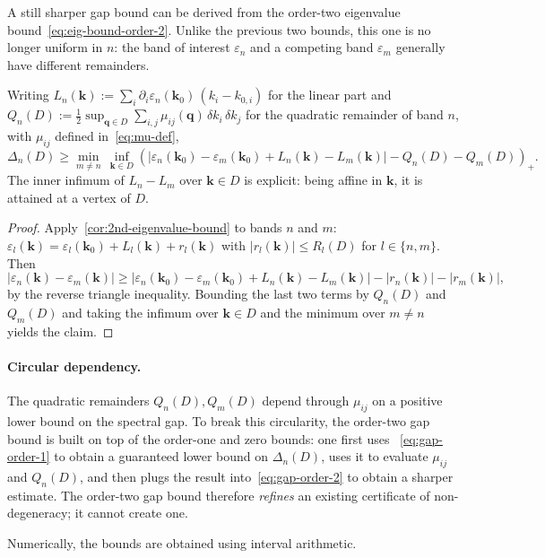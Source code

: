 \documentclass[11pt]{article}
\numberwithin{equation}{section}
\begin{document}
A still sharper gap bound can be derived from the order-two eigenvalue
bound~\eqref{eq:eig-bound-order-2}. Unlike the previous two bounds, this one is
no longer uniform in \(n\): the band of interest \(\varepsilon_n\) and a
competing band \(\varepsilon_m\) generally have different remainders.

\begin{corollary}\label{cor:gap-order-2}
    Writing \(L_n(\mathbf{k}) := \sum_i \partial_i \varepsilon_n(\mathbf{k}_0)\,
    (k_i - k_{0,i})\) for the linear part and
    \(Q_n(D) := \tfrac{1}{2} \sup_{\mathbf{q} \in D}
    \sum_{i,j} \mu_{ij}(\mathbf{q})\, \delta k_i\, \delta k_j\) for the quadratic
    remainder of band \(n\), with \(\mu_{ij}\) defined in~\eqref{eq:mu-def},
    \begin{equation}
        \Delta_n(D) \geq \min_{m \neq n}\,\inf_{\mathbf{k} \in D}
        \left( |\varepsilon_n(\mathbf{k}_0) - \varepsilon_m(\mathbf{k}_0)
        + L_n(\mathbf{k}) - L_m(\mathbf{k})|
        - Q_n(D) - Q_m(D) \right)_+.
        \label{eq:gap-order-2}
    \end{equation}
    The inner infimum of \(L_n - L_m\) over \(\mathbf{k} \in D\) is explicit:
    being affine in \(\mathbf{k}\), it is attained at a vertex of \(D\).
\end{corollary}

\begin{proof}
    Apply~\autoref{cor:2nd-eigenvalue-bound} to bands \(n\) and \(m\):
    \(\varepsilon_l(\mathbf{k}) = \varepsilon_l(\mathbf{k}_0) + L_l(\mathbf{k})
    + r_l(\mathbf{k})\) with \(|r_l(\mathbf{k})| \leq R_l(D)\) for
    \(l \in \{n, m\}\). Then
    \begin{equation}
        |\varepsilon_n(\mathbf{k}) - \varepsilon_m(\mathbf{k})|
        \geq |\varepsilon_n(\mathbf{k}_0) - \varepsilon_m(\mathbf{k}_0)
        + L_n(\mathbf{k}) - L_m(\mathbf{k})|
        - |r_n(\mathbf{k})| - |r_m(\mathbf{k})|,
    \end{equation}
    by the reverse triangle inequality. Bounding the last two terms by
    \(Q_n(D)\) and \(Q_m(D)\) and taking the infimum over \(\mathbf{k} \in D\)
    and the minimum over \(m \neq n\) yields the claim.
\end{proof}

\paragraph{Circular dependency.}
The quadratic remainders \(Q_n(D), Q_m(D)\) depend through \(\mu_{ij}\) on a positive
lower bound on the spectral gap. To break this circularity, the order-two gap
bound is built on top of the order-one and zero bounds: one first uses
~\eqref{eq:gap-order-1} to obtain a guaranteed lower bound on \(\Delta_n(D)\),
uses it to evaluate \(\mu_{ij}\) and \(Q_n(D)\), and then plugs the result
into~\eqref{eq:gap-order-2} to obtain a sharper estimate. The order-two gap
bound therefore \emph{refines} an existing certificate of non-degeneracy; it
cannot create one.
\begin{remark}
    Numerically, the bounds are obtained using interval arithmetic.
\end{remark}
\end{document}

